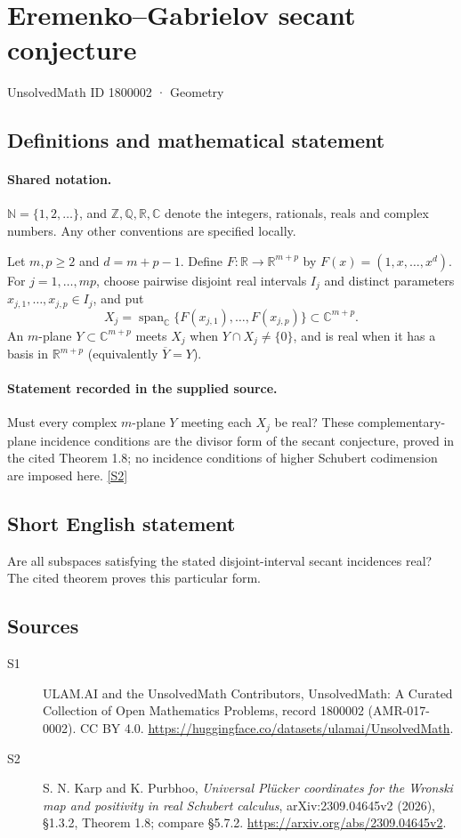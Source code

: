 \documentclass[11pt]{article}
\newcommand{\sref}[2]{\hyperlink{source:#1:#2}{[S#2]}}
\begin{document}
\setcounter{section}{1800001}
\section{Eremenko–Gabrielov secant conjecture}\label{1800002}
{\small\sffamily UnsolvedMath ID 1800002 · Geometry}
\subsection{Definitions and mathematical statement}

\paragraph{Shared notation.}$\mathbb N=\{1,2,\ldots\}$, and $\mathbb Z,\mathbb Q,\mathbb R,\mathbb C$ denote the integers, rationals, reals and complex numbers. Any other conventions are specified locally.


Let $m,p\geq2$ and $d=m+p-1$. Define $F:\mathbb R\to\mathbb R^{m+p}$ by $F(x)=(1,x,\ldots,x^d)$. For $j=1,\ldots,mp$, choose pairwise disjoint real intervals $I_j$ and distinct parameters $x_{j,1},\ldots,x_{j,p}\in I_j$, and put
\[X_j=\operatorname{span}_{\mathbb C}\{F(x_{j,1}),\ldots,F(x_{j,p})\}\subset\mathbb C^{m+p}.
\]
An $m$-plane $Y\subset\mathbb C^{m+p}$ meets $X_j$ when $Y\cap X_j\neq\{0\}$, and is real when it has a basis in $\mathbb R^{m+p}$ (equivalently $\overline Y=Y$).
\paragraph{Statement recorded in the supplied source.}
Must every complex $m$-plane $Y$ meeting each $X_j$ be real? These complementary-plane incidence conditions are the divisor form of the secant conjecture, proved in the cited Theorem 1.8; no incidence conditions of higher Schubert codimension are imposed here. \sref{1800002}{2}
\subsection{Short English statement}
Are all subspaces satisfying the stated disjoint-interval secant incidences real? The cited theorem proves this particular form.
\subsection{Sources}
\begin{description}
\item[\hypertarget{source:1800002:1}{S1}] ULAM.AI and the UnsolvedMath Contributors, UnsolvedMath: A Curated Collection of Open Mathematics Problems, record 1800002 (AMR-017-0002). CC BY 4.0. \url{https://huggingface.co/datasets/ulamai/UnsolvedMath}.
\item[\hypertarget{source:1800002:2}{S2}] S. N. Karp and K. Purbhoo, \emph{Universal Plücker coordinates for the Wronski map and positivity in real Schubert calculus}, arXiv:2309.04645v2 (2026), §1.3.2, Theorem 1.8; compare §5.7.2. \url{https://arxiv.org/abs/2309.04645v2}.
\end{description}
\label{end:1800002}
\end{document}
